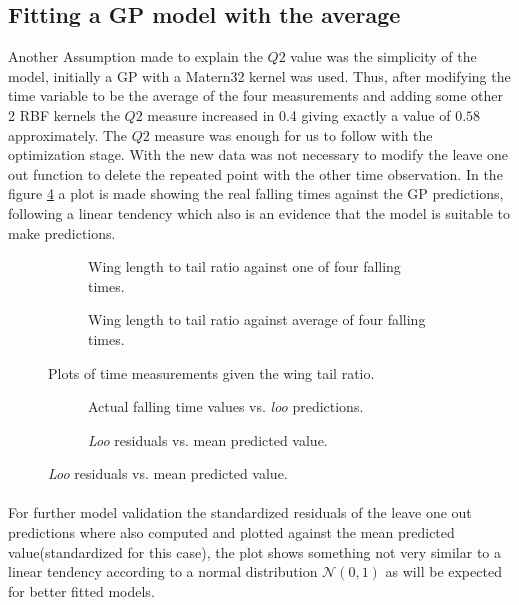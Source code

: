 \subsection{Fitting a GP model with the average}

Another Assumption made to explain the $Q2$ value was the simplicity of the
model, initially a GP with a Matern32 kernel was used. Thus, after modifying
the time variable to be the average of the four measurements and adding some
other 2 RBF kernels the $Q2$ measure increased in 0.4 giving exactly a value of
$0.58$ approximately. The $Q2$ measure was enough for us to follow with the
optimization stage. With the new data was not necessary to modify the leave one
out function to delete the repeated point with the other time observation. In
the figure \ref{mloo_vs_real} a plot is made showing the real falling times
against the GP predictions, following a linear tendency which also is an
evidence that the model is suitable to make predictions.


\begin{figure}
	\begin{subfigure}[h]{.5\linewidth}
		
		\caption{Wing length to tail ratio against one of four falling times.}
		\label{fig_wtr_vs_obs2}
	\end{subfigure}
	\begin{subfigure}[h]{.5\linewidth}
		
		\caption{Wing length to tail ratio against average of four falling times.}
		\label{fig_wtr_vs_avg4}
	\end{subfigure}
	\caption{Plots of time measurements given the wing tail ratio.}
\end{figure}

\begin{figure}[h]
	\begin{subfigure}{.5\linewidth}
		\centering
		\scalebox{0.8}{}
		\caption{Actual falling time values vs. \emph{loo} predictions.}
		\label{mloo_vs_real}
	\end{subfigure}
	\begin{subfigure}{.5\linewidth}
		\centering
		\scalebox{0.8}{}
		\caption{\emph{Loo} residuals vs. mean predicted value.}
		\label{mlooresiduals_vs_real}
	\end{subfigure}
\end{figure}

\paragraph{}
For further model validation the standardized residuals of the leave one out
predictions where also computed and plotted against the mean predicted
value(standardized for this case), the plot shows something not very similar to
a linear tendency according to a normal distribution $\mathcal{N}(0,1)$ as will
be expected for better fitted models.